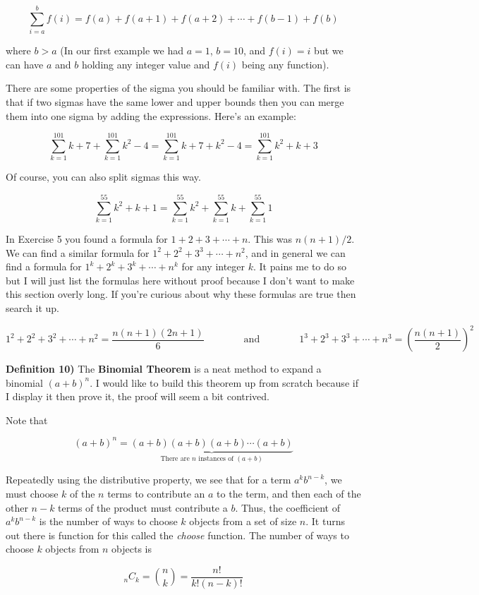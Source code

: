 \documentclass[a4paper]{article}
\begin{document}
$$\sum_{i=a}^{b}{f(i)}=f(a)+f(a+1)+f(a+2)+\cdots+f(b-1)+f(b)$$

where $b>a$ (In our first example we had $a=1$, $b=10$, and $f(i)=i$ but we can have $a$ and $b$ holding any integer value and $f(i)$ being any function).

There are some properties of the sigma you should be familiar with. The first is that if two sigmas have the same lower and upper bounds then you can merge them into one sigma by adding the expressions. Here's an example:

$$\sum_{k=1}^{101}{k+7}+\sum_{k=1}^{101}{k^2-4} = \sum_{k=1}^{101}{k+7+k^2-4}=\sum_{k=1}^{101}{k^2+k+3}$$

Of course, you can also split sigmas this way.

$$\sum_{k=1}^{55}{k^2+k+1}=\sum_{k=1}^{55}{k^2} + \sum_{k=1}^{55}{k} + \sum_{k=1}^{55}{1}$$

In Exercise 5 you found a formula for $1+2+3+\cdots+n$. This was $n(n+1)/2$. We can find a similar formula for $1^2+2^2+3^3+\cdots+n^2$, and in general we can find a formula for $1^k+2^k+3^k+\cdots+n^k$ for any integer $k$. It pains me to do so but I will just list the formulas here without proof because I don't want to make this section overly long. If you're curious about why these formulas are true then search it up.

$$1^2+2^2+3^2+\cdots+n^2=\frac{n(n+1)(2n+1)}{6} \qquad \qquad \text{and} \qquad \qquad 1^3+2^3+3^3+\cdots+n^3=\left(\frac{n(n+1)}{2}\right)^2$$

\textbf{Definition 10)} The \textbf{Binomial Theorem} is a neat method to expand a binomial $(a+b)^n$. I would like to build this theorem up from scratch because if I display it then prove it, the proof will seem a bit contrived.

Note that

$$(a+b)^n=\underbrace{(a+b)(a+b)(a+b)\cdots(a+b)}_{\text{There are }n\text{ instances of }(a+b)}$$

Repeatedly using the distributive property, we see that for a term $a^{k}b^{n-k}$, we must choose $k$ of the $n$ terms to contribute an $a$ to the term, and then each of the other $n-k$ terms of the product must contribute a $b$. Thus, the coefficient of $a^{k}b^{n-k}$ is the number of ways to choose $k$ objects from a set of size $n$. It turns out there is function for this called the \textit{choose} function. The number of ways to choose $k$ objects from $n$ objects is

$$_{n} C_{k} = \binom{n}{k} = \frac{n!}{k!(n-k)!}$$
\end{document}
